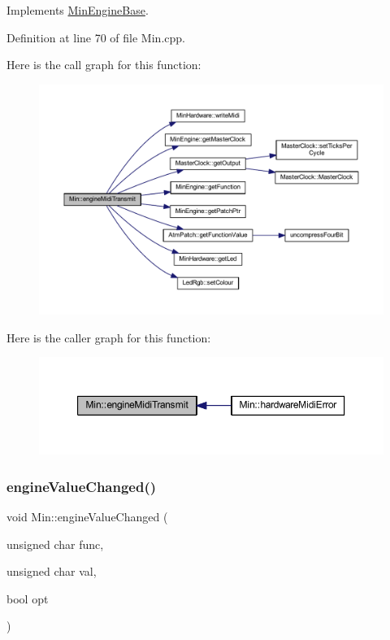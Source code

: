 Implements \hyperlink{class_min_engine_base_aaed6930bcc32b2cccf9479fb73d043d9}{Min\+Engine\+Base}.



Definition at line 70 of file Min.\+cpp.

Here is the call graph for this function\+:
\nopagebreak
\begin{figure}[H]
\begin{center}
\leavevmode
\includegraphics[width=350pt]{class_min_a4b150119664bd46bd2a80561862ff666_cgraph}
\end{center}
\end{figure}
Here is the caller graph for this function\+:
\nopagebreak
\begin{figure}[H]
\begin{center}
\leavevmode
\includegraphics[width=350pt]{class_min_a4b150119664bd46bd2a80561862ff666_icgraph}
\end{center}
\end{figure}
\mbox{\label{class_min_a9fe42a8d40c06d73556cf6d0dac2dc71}} 
\subsubsection{\texorpdfstring{engine\+Value\+Changed()}{engineValueChanged()}}
{\footnotesize\ttfamily void Min\+::engine\+Value\+Changed (\begin{DoxyParamCaption}\item[{unsigned char}]{func,  }\item[{unsigned char}]{val,  }\item[{bool}]{opt }\end{DoxyParamCaption})\hspace{0.3cm}{\ttfamily [virtual]}}



